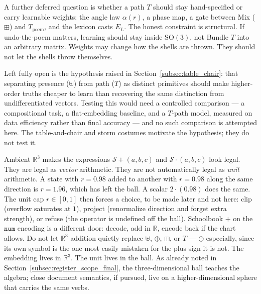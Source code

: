\documentclass[12pt, a4paper]{article}
\begin{document}
A further deferred question is whether a path $T$ should stay
hand-specified or carry learnable weights: the angle law
$\alpha(r)$, a phase map, a gate between Mix ($\boxplus$) and
$T_{\mathrm{poem}}$, and the lexicon casts $E_L$. The honest
constraint is structural. If undo-the-poem matters, learning should
stay inside $\mathrm{SO}(3)$, not Bundle $T$ into an arbitrary
matrix. Weights may change how the shells are thrown. They should
not let the shells throw themselves.

Left fully open is the hypothesis raised in
Section~\ref{subsec:table_chair}: that separating presence
($\uplus$) from path ($T$) as distinct primitives should make
higher-order truths cheaper to learn than recovering the same
distinction from undifferentiated vectors. Testing this would need a
controlled comparison --- a compositional task, a flat-embedding
baseline, and a $T$-path model, measured on data efficiency rather
than final accuracy --- and no such comparison is attempted here.
The table-and-chair and storm costumes motivate the hypothesis; they
do not test it.

Ambient $\mathbb{R}^3$ makes the expressions
$\mathcal{S}+(a,b,c)$ and $\mathcal{S}\cdot(a,b,c)$ look legal.
They are legal as \emph{vector} arithmetic. They are not automatically
legal as \emph{unit} arithmetic. A state with $r=0.98$ added to
another with $r=0.98$ along the same direction is $r=1.96$, which
has left the ball. A scalar $2\cdot(0.98)$ does the same. The unit
cap $r\in[0,1]$ then forces a choice, to be made later and not
here: clip (overflow saturates at $1$), project (renormalize
direction and forget extra strength), or refuse (the operator is
undefined off the ball). Schoolbook $+$ on the $\mathtt{num}$
encoding is a different door: decode, add in $\mathbb{R}$, encode
back if the chart allows. Do not let $\mathbb{R}^3$ addition
quietly replace $\uplus$, $\oplus$, $\boxplus$, or $T$ --- $\oplus$
especially, since its own symbol is the one most easily mistaken for
the plus sign it is not. The embedding
lives in $\mathbb{R}^3$. The unit lives in the ball.
As already noted in Section~\ref{subsec:register_scope_final},
the three-dimensional ball teaches the algebra; close document
semantics, if pursued, live on a higher-dimensional sphere that
carries the same verbs.
\end{document}
